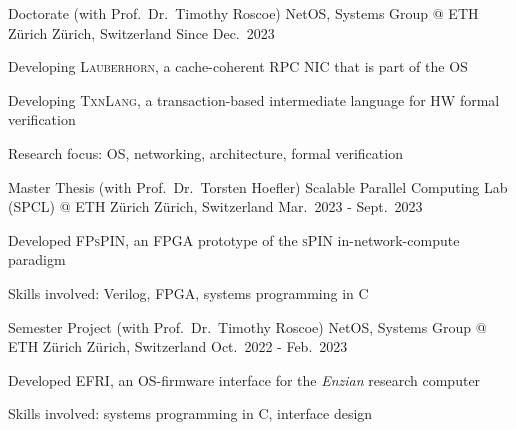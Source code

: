
\begin{cventries}

  \cventry
    {Doctorate (with Prof.\ Dr.\ Timothy Roscoe)} %
    {NetOS, Systems Group @ ETH Z\"urich} %
    {Z\"urich, Switzerland} %
    {Since Dec.\ 2023} %
    {
        \begin{cvitems}
            \item {Developing \textsc{Lauberhorn}, a cache-coherent RPC NIC
                that is part of the OS}
            \item {Developing \textsc{TxnLang}, a transaction-based
                intermediate language for HW formal verification}
            \item {Research focus: OS, networking, architecture, formal
                verification}
        \end{cvitems}
    }

  \cventry
    {Master Thesis (with Prof.\ Dr.\ Torsten Hoefler)} %
    {Scalable Parallel Computing Lab (SPCL) @ ETH Z\"urich} %
    {Z\"urich, Switzerland} %
    {Mar.\ 2023 - Sept.\ 2023} %
    {
        \begin{cvitems}
            \item {Developed \textsc{FPsPIN}, an FPGA prototype of the
                \textsc{sPIN} in-network-compute paradigm}
            \item {Skills involved: Verilog, FPGA, systems programming in C}
        \end{cvitems}
    }

  \cventry
    {Semester Project (with Prof.\ Dr.\ Timothy Roscoe)} %
    {NetOS, Systems Group @ ETH Z\"urich} %
    {Z\"urich, Switzerland} %
    {Oct.\ 2022 - Feb.\ 2023} %
    {
        \begin{cvitems}
            \item {Developed \textsc{EFRI}, an OS-firmware interface for the
                \emph{Enzian} research computer}
            \item {Skills involved: systems programming in C, interface design}
        \end{cvitems}
    }


\end{cventries}
